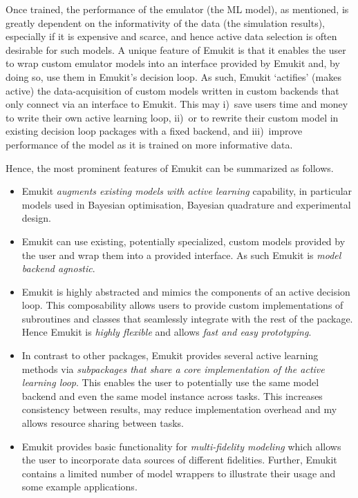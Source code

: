 Once trained, the performance of the emulator (the ML model), as mentioned, is greatly dependent on the informativity of the data (the simulation results), especially if it is expensive and scarce, and hence active data selection is often desirable for such models. A unique feature of Emukit is that it enables the user to wrap custom emulator models into an interface provided by Emukit and, by doing so, use them in Emukit's decision loop. As such, Emukit `actifies' (makes active) the data-acquisition of custom models written in custom backends that only connect via an interface to Emukit. This may i)~save users time and money to write their own active learning loop, ii)~or to rewrite their custom model in existing decision loop packages with a fixed backend, and iii)~improve performance of the model as it is trained on more informative data.

Hence, the most prominent features of Emukit can be summarized as follows.

\begin{itemize}
\item Emukit \emph{augments existing models with active learning} capability, in particular models used in Bayesian optimisation, Bayesian quadrature and experimental design.
\item Emukit can use existing, potentially specialized, custom models provided by the user and wrap them into a provided interface. As such Emukit is \emph{model backend agnostic}.
\item Emukit is highly abstracted and mimics the components of an active decision loop. This composability allows users to provide custom implementations of subroutines and classes that seamlessly integrate with the rest of the package. Hence Emukit is \emph{highly flexible} and allows \emph{fast and easy prototyping}.
\item In contrast to other packages, Emukit provides several active learning methods via \emph{subpackages that share a core implementation of the active learning loop}. This enables the user to potentially use the same model backend and even the same model instance across tasks. This increases consistency between results, may reduce implementation overhead and my allows resource sharing between tasks.
\item Emukit provides basic functionality for \emph{multi-fidelity modeling} which allows the user to incorporate data sources of different fidelities. Further, Emukit contains a limited number of model wrappers to illustrate their usage and some example applications.
\end{itemize}

